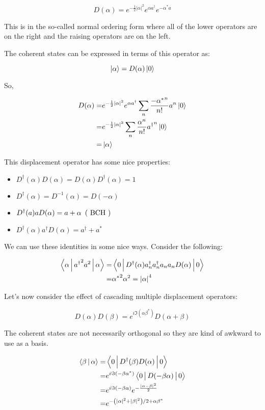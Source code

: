 \documentclass{article}
\begin{document}
\[
   D(\alpha) = e^{-\frac{1}{2}\left| \alpha \right|^2} e^{\alpha a^\dagger} e^{-
   \alpha^* a} 
\]

This is in the so-called normal ordering form where all of the lower operators
are on the right and the raising operators are on the left.

The coherent states can be expressed in terms of this operator as:

\[
   \Ket{\alpha} = D(\alpha) \Ket{0}
\]

So,

\begin{align*}
   D(\alpha) =& e^{-\frac{1}{2} \left| \alpha \right|^2} e^{\alpha a^\dagger}
   \sum_n \frac{- { \alpha^* }^n }{n!} a^n \Ket{0}  \\
   =& e^{-\frac{1}{2} \left| \alpha \right|^2} \sum_n \frac{\alpha^n}{n!}
   {a^\dagger}^n \Ket{0} \\
   =& \Ket{\alpha}
\end{align*}

This displacement operator has some nice properties:

\begin{itemize}
   \item $ D^\dagger(\alpha) D(\alpha) = D(\alpha) D^\dagger(\alpha) = 1 $
   \item $ D^\dagger (\alpha) = D^{-1} (\alpha) = D(-\alpha) $ 
   \item $ D^\dagger(a) a D(\alpha) = a + \alpha \enskip \text{( BCH )} $ 
   \item $D^\dagger(\alpha) a^\dagger D(\alpha) = a^\dagger + a^*$
\end{itemize}

We can use these identities in some nice ways. Consider the following:

\begin{align*}
   \Braket{\alpha | {a^\dagger}^2 a^2 | \alpha} =& \Braket{0 | D^\dagger(\alpha)
   a^\dagger_n a^\dagger_n a_n a_n D(\alpha) | 0} \\
   =& {\alpha^*}^2 \alpha^2 = \left| \alpha \right|^4
\end{align*}

Let's now consider the effect of cascading multiple displacement operators:

\[
   D(\alpha)D(\beta) = e^{i \Im{(\alpha\beta^*)} } D(\alpha+\beta)
\]

The coherent states are not necessarily orthogonal so they are kind of awkward
to use as a basis.

\begin{align*}
   \Braket{\beta | \alpha} =& \Braket{0 | D^\dagger(\beta) D(\alpha) | 0} \\
   =& e^{i \Im{(-\beta \alpha^*)}} \Braket{0 | D(-\beta \alpha) | 0} \\
   =& e^{i \Im{\left( -\beta \alpha \right)}} e^{-\frac{\left| \alpha - \beta
\right|^2}{2}} \\
=& e^{-\left( \left| \alpha \right|^2 + \left| \beta \right|^2 \right)/2 +
\alpha\beta^*}  
\end{align*}
\end{document}
